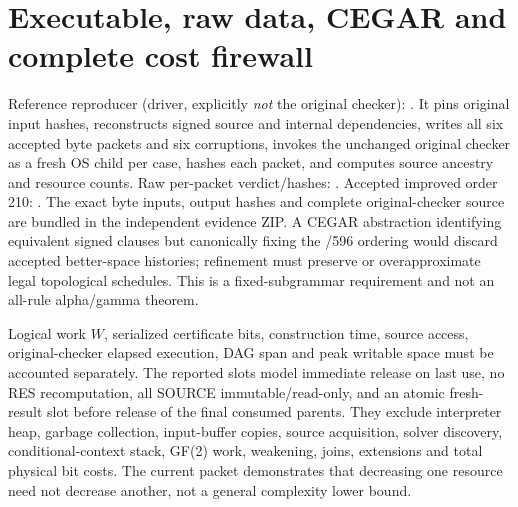 \documentclass[11pt]{article}
\begin{document}
\section*{Executable, raw data, CEGAR and complete cost firewall}
Reference reproducer (driver, explicitly \emph{not} the original checker): . It pins original input hashes, reconstructs signed source and internal dependencies, writes all six accepted byte packets and six corruptions, invokes the unchanged original checker as a fresh OS child per case, hashes each packet, and computes source ancestry and resource counts. Raw per-packet verdict/hashes: . Accepted improved order 210: . The exact byte inputs, output hashes and complete original-checker source are bundled in the independent evidence ZIP. A CEGAR abstraction identifying equivalent signed clauses but canonically fixing the /596 ordering would discard accepted better-space histories; refinement must preserve or overapproximate legal topological schedules. This is a fixed-subgrammar requirement and not an all-rule alpha/gamma theorem.

Logical work $W$, serialized certificate bits, construction time, source access, original-checker elapsed execution, DAG span and peak writable space must be accounted separately. The reported slots model immediate release on last use, no RES recomputation, all SOURCE immutable/read-only, and an atomic fresh-result slot before release of the final consumed parents. They exclude interpreter heap, garbage collection, input-buffer copies, source acquisition, solver discovery, conditional-context stack, GF(2) work, weakening, joins, extensions and total physical bit costs. The current packet demonstrates that decreasing one resource need not decrease another, not a general complexity lower bound.
\end{document}
